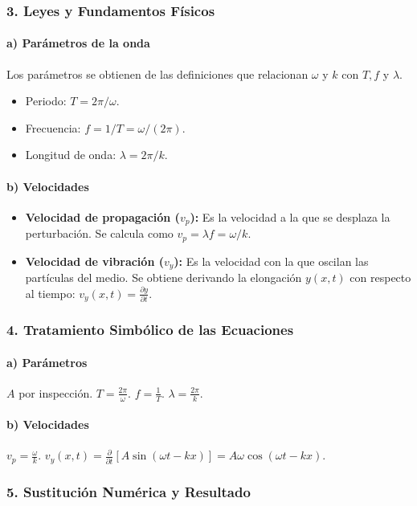 \subsubsection*{3. Leyes y Fundamentos Físicos}
\paragraph{a) Parámetros de la onda}
Los parámetros se obtienen de las definiciones que relacionan $\omega$ y $k$ con $T, f$ y $\lambda$.
\begin{itemize}
    \item Periodo: $T = 2\pi/\omega$.
    \item Frecuencia: $f = 1/T = \omega/(2\pi)$.
    \item Longitud de onda: $\lambda = 2\pi/k$.
\end{itemize}
\paragraph{b) Velocidades}
\begin{itemize}
    \item \textbf{Velocidad de propagación ($v_p$):} Es la velocidad a la que se desplaza la perturbación. Se calcula como $v_p = \lambda f = \omega/k$.
    \item \textbf{Velocidad de vibración ($v_y$):} Es la velocidad con la que oscilan las partículas del medio. Se obtiene derivando la elongación $y(x,t)$ con respecto al tiempo: $v_y(x,t) = \frac{\partial y}{\partial t}$.
\end{itemize}

\subsubsection*{4. Tratamiento Simbólico de las Ecuaciones}
\paragraph{a) Parámetros}
$A$ por inspección. $T = \frac{2\pi}{\omega}$. $f = \frac{1}{T}$. $\lambda = \frac{2\pi}{k}$.

\paragraph{b) Velocidades}
$v_p = \frac{\omega}{k}$.
$v_y(x,t) = \frac{\partial}{\partial t} [A\sin(\omega t - kx)] = A\omega\cos(\omega t - kx)$.

\subsubsection*{5. Sustitución Numérica y Resultado}
